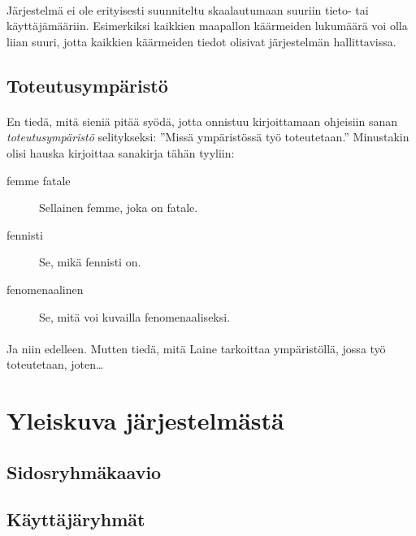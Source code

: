 \documentclass[11pt]{article}
\begin{document}
\paragraph{} Järjestelmä ei ole erityisesti suunniteltu skaalautumaan suuriin tieto- tai käyttäjämääriin. Esimerkiksi kaikkien maapallon käärmeiden lukumäärä voi olla liian suuri, jotta kaikkien käärmeiden tiedot olisivat järjestelmän hallittavissa.

\subsection{Toteutusympäristö}

\paragraph{} En tiedä, mitä sieniä pitää syödä, jotta onnistuu kirjoittamaan ohjeisiin sanan \emph{toteutusympäristö} selitykseksi: ''Missä ympäristössä työ toteutetaan.'' Minustakin olisi hauska kirjoittaa sanakirja tähän tyyliin:

\begin{description}
\item[femme fatale] Sellainen femme, joka on fatale.
\item[fennisti] Se, mikä fennisti on.
\item[fenomenaalinen] Se, mitä voi kuvailla fenomenaaliseksi.
\end{description}

\paragraph{} Ja niin edelleen. Mutten tiedä, mitä Laine tarkoittaa ympäristöllä, jossa työ toteutetaan, joten\ldots

\section{Yleiskuva järjestelmästä}

\subsection{Sidosryhmäkaavio}


\subsection{Käyttäjäryhmät}
\end{document}
